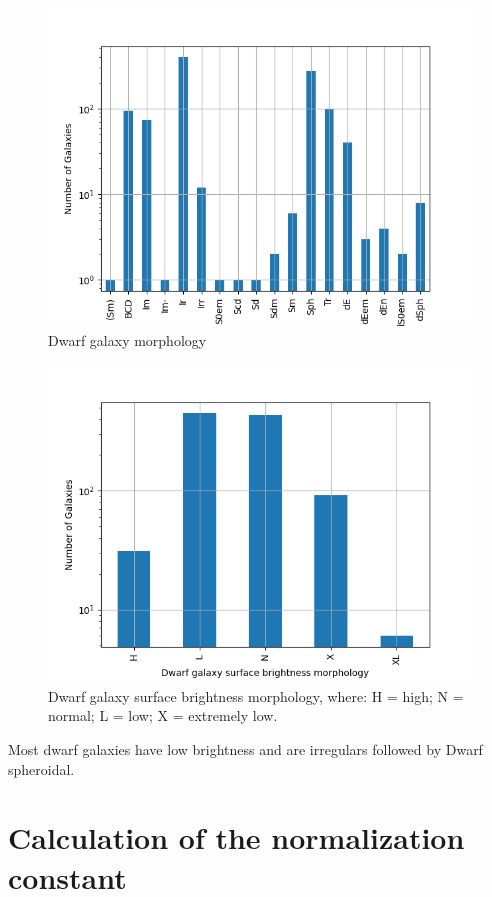\documentclass[a4paper]{article}
\begin{document}
\begin{figure}[htbp]
\centering
\includegraphics[width=.9\linewidth]{./graphs/hist-Tdw1.png}
\caption{\label{Types of dwarf galaxies}Dwarf galaxy morphology}
\end{figure}

\begin{figure}[htbp]
\centering
\includegraphics[width=.9\linewidth]{./graphs/hist-Tdw2.png}
\caption{\label{Types of dwarf galaxies brightness}Dwarf galaxy surface brightness morphology, where: H = high; N = normal; L = low; X = extremely low.}
\end{figure}

Most dwarf galaxies have low brightness and are irregulars followed by Dwarf spheroidal.

\section{Calculation of the normalization constant}
\label{sec:orgbfb382e}
\end{document}
